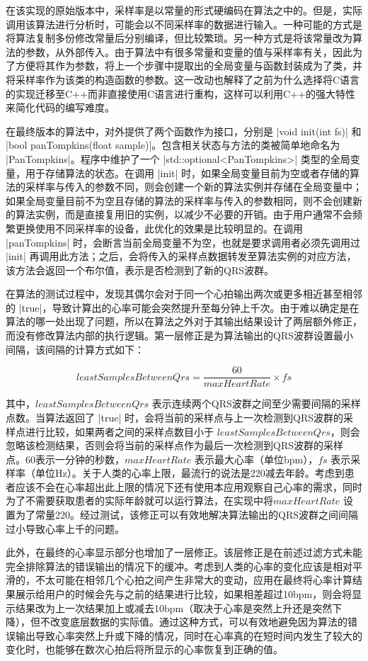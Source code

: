 在该实现的原始版本中，采样率是以常量的形式硬编码在算法之中的。但是，实际调用该算法进行分析时，可能会以不同采样率的数据进行输入。一种可能的方式是将算法复制多份修改常量后分别编译，但比较繁琐。另一种方式是将该常量改为算法的参数，从外部传入。由于算法中有很多常量和变量的值与采样率有关，因此为了方便将其作为参数，将上一个步骤中提取出的全局变量与函数封装成为了类，并将采样率作为该类的构造函数的参数。这一改动也解释了之前为什么选择将C语言的实现迁移至C++而非直接使用C语言进行重构，这样可以利用C++的强大特性来简化代码的编写难度。

在最终版本的算法中，对外提供了两个函数作为接口，分别是 |void init(int fs)| 和 |bool panTompkins(float sample)|。包含相关状态与方法的类被简单地命名为 |PanTompkins|。程序中维护了一个 |std::optional<PanTompkins>| 类型的全局变量，用于存储算法的状态。在调用 |init| 时，如果全局变量目前为空或者存储的算法的采样率与传入的参数不同，则会创建一个新的算法实例并存储在全局变量中；如果全局变量目前不为空且存储的算法的采样率与传入的参数相同，则不会创建新的算法实例，而是直接复用旧的实例，以减少不必要的开销。由于用户通常不会频繁更换使用不同采样率的设备，此优化的效果是比较明显的。在调用 |panTompkins| 时，会断言当前全局变量不为空，也就是要求调用者必须先调用过 |init| 再调用此方法；之后，会将传入的采样点数据转发至算法实例的对应方法，该方法会返回一个布尔值，表示是否检测到了新的QRS波群。

在算法的测试过程中，发现其偶尔会对于同一个心拍输出两次或更多相近甚至相邻的 |true|，导致计算出的心率可能会突然提升至每分钟上千次。由于难以确定是在算法的哪一处出现了问题，所以在算法之外对于其输出结果设计了两层额外修正，而没有修改算法内部的执行逻辑。第一层修正是为算法输出的QRS波群设置最小间隔，该间隔的计算方式如下：

\[
    leastSamplesBetweenQrs = \frac{60}{maxHeartRate} \times fs
\]

其中，\(leastSamplesBetweenQrs\) 表示连续两个QRS波群之间至少需要间隔的采样点数。当算法返回了 |true| 时，会将当前的采样点与上一次检测到QRS波群的采样点进行比较，如果两者之间的采样点数目小于 \(leastSamplesBetweenQrs\)，则会忽略该检测结果，否则会将当前的采样点作为最后一次检测到QRS波群的采样点。60表示一分钟的秒数，\(maxHeartRate\) 表示最大心率（单位bpm），\(fs\) 表示采样率（单位Hz）。关于人类的心率上限，最流行的说法是220减去年龄。考虑到患者应该不会在心率超出此上限的情况下还有使用本应用观察自己心率的需求，同时为了不需要获取患者的实际年龄就可以运行算法，在实现中将\(maxHeartRate\) 设置为了常量220。经过测试，该修正可以有效地解决算法输出的QRS波群之间间隔过小导致心率上千的问题。

此外，在最终的心率显示部分也增加了一层修正。该层修正是在前述过滤方式未能完全排除算法的错误输出的情况下的缓冲。考虑到人类的心率的变化应该是相对平滑的，不太可能在相邻几个心拍之间产生非常大的变动，应用在最终将心率计算结果展示给用户的时候会先与之前的结果进行比较，如果相差超过10bpm，则会将显示结果改为上一次结果加上或减去10bpm（取决于心率是突然上升还是突然下降），但不改变底层数据的实际值。通过这种方式，可以有效地避免因为算法的错误输出导致心率突然上升或下降的情况，同时在心率真的在短时间内发生了较大的变化时，也能够在数次心拍后将所显示的心率恢复到正确的值。

